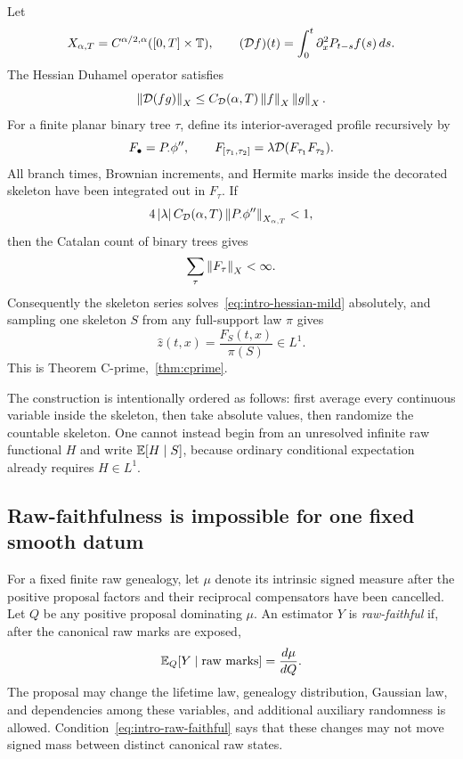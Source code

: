 Let
\begin{equation*}
  X_{\alpha,T}=C^{\alpha/2,\alpha}([0,T]\times\mathbb T),
  \qquad
  (\mathcal D f)(t)=\int_0^t\partial_x^2P_{t-s}f(s)\,ds.
\end{equation*}
The Hessian Duhamel operator satisfies
\begin{equation*}
  \left\lVert\mathcal D(fg)\right\rVert_X
  \leq
  C_{\mathcal D}(\alpha,T)\left\lVert f\right\rVert_X\left\lVert g\right\rVert_X.
\end{equation*}
For a finite planar binary tree $\tau$, define its interior-averaged profile recursively by
\begin{equation*}
  F_\bullet=P_\cdot\phi'',
  \qquad
  F_{[\tau_1,\tau_2]}
  =
  \lambda\mathcal D(F_{\tau_1}F_{\tau_2}).
\end{equation*}
All branch times, Brownian increments, and Hermite marks inside the decorated skeleton have been integrated out in $F_\tau$. If
\begin{equation}
  4\left|\lambda\right| C_{\mathcal D}(\alpha,T)
  \left\lVert P_\cdot\phi''\right\rVert_{X_{\alpha,T}}<1,
  \label{eq:intro-cprime-smallness}
\end{equation}
then the Catalan count of binary trees gives
\begin{equation*}
  \sum_\tau\left\lVert F_\tau\right\rVert_X<\infty.
\end{equation*}
Consequently the skeleton series solves~\eqref{eq:intro-hessian-mild} absolutely, and sampling one skeleton $S$ from any full-support law $\pi$ gives
\begin{equation*}
  \widehat z(t,x)=\frac{F_S(t,x)}{\pi(S)}\in L^1.
\end{equation*}
This is Theorem C-prime,~\cref{thm:cprime}.

The construction is intentionally ordered as follows: first average every continuous variable inside the skeleton, then take absolute values, then randomize the countable skeleton. One cannot instead begin from an unresolved infinite raw functional $H$ and write $\mathbb E[H\mid S]$, because ordinary conditional expectation already requires $H\in L^1$.

\subsection{Raw-faithfulness is impossible for one fixed smooth datum}

For a fixed finite raw genealogy, let $\mu$ denote its intrinsic signed measure after the positive proposal factors and their reciprocal compensators have been cancelled. Let $Q$ be any positive proposal dominating $\mu$. An estimator $Y$ is \emph{raw-faithful} if, after the canonical raw marks are exposed,
\begin{equation}
  \mathbb E_Q[Y\mid\text{raw marks}]
  =
  \frac{d\mu}{dQ}.
  \label{eq:intro-raw-faithful}
\end{equation}
The proposal may change the lifetime law, genealogy distribution, Gaussian law, and dependencies among these variables, and additional auxiliary randomness is allowed. Condition~\eqref{eq:intro-raw-faithful} says that these changes may not move signed mass between distinct canonical raw states.

